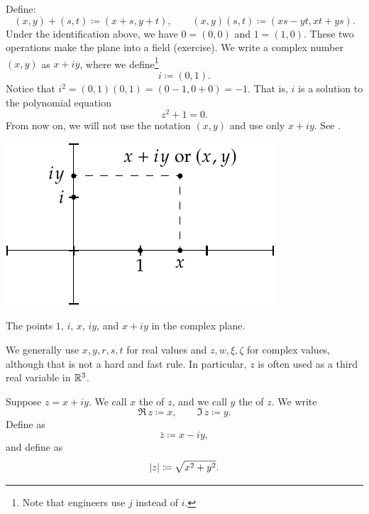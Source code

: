 Define:
\begin{equation*}
(x,y) + (s,t) \coloneqq (x+s,y+t) , \qquad
(x,y) (s,t) \coloneqq (xs-yt,xt+ys) .
\end{equation*}
Under the identification above, we have $0 = (0,0)$ and $1 = (1,0)$.  These
two operations make the plane into a field (exercise).
We write a complex number $(x,y)$ as $x+iy$, where we
define\footnote{Note that engineers use $j$ instead of $i$.}
\begin{equation*}
i \coloneqq (0,1) .
\end{equation*}
Notice that $i^2 = (0,1)(0,1) = (0-1,0+0) = -1$.
That is, $i$ is a solution to the polynomial equation
\begin{equation*}
z^2+1=0 .
\end{equation*}
From now on, we will not use the notation $(x,y)$ and use only $x+iy$.
See .
\begin{myfigureht}
\includegraphics{figures/complexplane}
\caption{The points $1$, $i$, $x$, $iy$, and $x+iy$ in the complex
plane.\label{fig:complexplane}}
\end{myfigureht}

We generally use $x,y,r,s,t$ for real values and $z,w,\xi,\zeta$
for complex values, although that is not a hard and fast rule.  In
particular, $z$ is often used as a third real variable in ${\mathbb{R}}^3$.

\begin{defn}
Suppose $z= x+iy$.
We call $x$ 
the \emph{} of $z$, and 
we call $y$
the \emph{} of $z$.  We write
\begin{equation*}
\Re\, z \coloneqq x , \qquad
\Im\, z \coloneqq y .
\end{equation*}
Define 
\emph{} as
\begin{equation*}
\bar{z} \coloneqq x-iy ,
\end{equation*}
and define \emph{} as
\begin{equation*}
\lvert {z} \rvert \coloneqq \sqrt{x^2+y^2} .
\end{equation*}
\end{defn}

